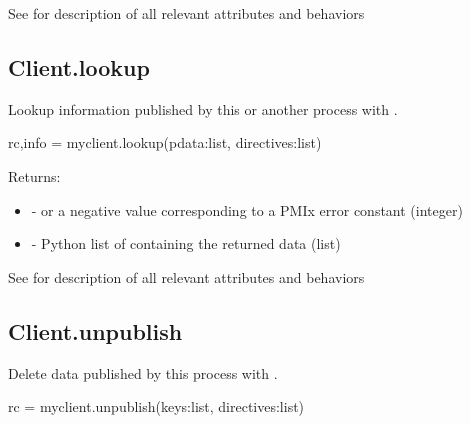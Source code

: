 See  for description of all relevant attributes and behaviors



\subsection{Client.lookup}

\summary

Lookup information published by this or another process with .

\format

\pyspecificstart
\begin{codepar}
rc,info = myclient.lookup(pdata:list, directives:list)
\end{codepar}
\pyspecificend

\begin{arglist}
\end{arglist}

Returns:

\begin{itemize}
    \item {} -  or a negative value corresponding to a PMIx error constant (integer)
    \item {} - Python list of  containing the returned data (list)
\end{itemize}


See  for description of all relevant attributes and behaviors


\subsection{Client.unpublish}

\summary

Delete data published by this process with .

\format

\pyspecificstart
\begin{codepar}
rc = myclient.unpublish(keys:list, directives:list)
\end{codepar}
\pyspecificend

